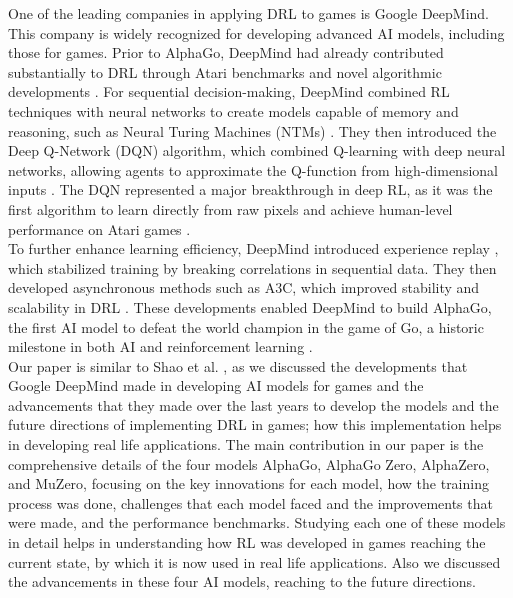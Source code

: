 One of the leading companies in applying DRL to games is Google DeepMind. 
This company is widely recognized for developing advanced AI models, including 
those for games. Prior to AlphaGo, DeepMind had already contributed 
substantially to DRL through Atari benchmarks and novel algorithmic 
developments \cite{mnih2015}\cite{bellemare2013}. For sequential decision-making, 
DeepMind combined RL techniques with neural networks to create models capable 
of memory and reasoning, such as Neural Turing Machines (NTMs) \cite{I4}. 
They then introduced the Deep Q-Network (DQN) algorithm, which combined 
Q-learning \cite{watkins1992}\cite{watkins1989} with deep neural networks, allowing agents to 
approximate the Q-function from high-dimensional inputs \cite{I6}. 
The DQN represented a major breakthrough in deep RL, as it was the first 
algorithm to learn directly from raw pixels and achieve human-level performance 
on Atari games \cite{mnih2015}. \\

To further enhance learning efficiency, DeepMind introduced experience replay 
\cite{I7}\cite{lin1992}, which stabilized training by breaking correlations in sequential data. 
They then developed asynchronous methods such as A3C, which improved stability 
and scalability in DRL \cite{I8}\cite{konda2000}\cite{tsitsiklis1997}. These developments 
enabled DeepMind to build AlphaGo, the first AI model to defeat the world 
champion in the game of Go, a historic milestone in both AI and reinforcement 
learning \cite{Silver2016}. \\ 

Our paper is similar to Shao et al. \cite{I12}, as we discussed the 
developments that Google DeepMind made in developing AI models for 
games and the advancements that they made over the last years to develop 
the models and the future directions of implementing DRL in games; 
how this implementation helps in developing real life applications. The
main contribution in our paper is the comprehensive details of the four 
models AlphaGo, AlphaGo Zero, AlphaZero, and MuZero, focusing on the key innovations for 
each model, how the training process was done, challenges that each model
faced and the improvements that were made, and the performance benchmarks. 
Studying each one of these models in detail helps in understanding how 
RL was developed in games reaching the current state, by which it is 
now used in real life applications. Also we discussed the advancements 
in these four AI models, reaching to the future directions.
